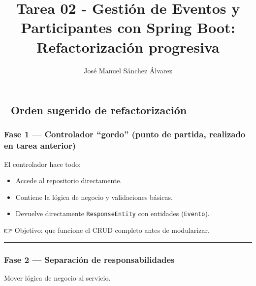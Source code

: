 \documentclass[
]{article}
\title{Tarea 02 - Gestión de Eventos y Participantes con Spring Boot:
Refactorización progresiva}
\author{José Manuel Sánchez Álvarez}
\date{}
\providecommand{\tightlist}{%
  \setlength{\itemsep}{0pt}\setlength{\parskip}{0pt}}
\begin{document}
\maketitle

{
\setcounter{tocdepth}{2}
\tableofcontents
}
\subsection{\texorpdfstring{🧩 \textbf{Orden sugerido de
refactorización}}{🧩 Orden sugerido de refactorización}}\label{orden-sugerido-de-refactorizaciuxf3n}

\subsubsection{\texorpdfstring{\textbf{Fase 1 --- Controlador ``gordo''
(punto de partida, realizado en tarea
anterior)}}{Fase 1 --- Controlador ``gordo'' (punto de partida, realizado en tarea anterior)}}\label{fase-1-controlador-gordo-punto-de-partida-realizado-en-tarea-anterior}

El controlador hace todo:

\begin{itemize}
\tightlist
\item
  Accede al repositorio directamente.
\item
  Contiene la lógica de negocio y validaciones básicas.
\item
  Devuelve directamente \texttt{ResponseEntity} con entidades
  (\texttt{Evento}).
\end{itemize}

👉 Objetivo: que funcione el CRUD completo antes de modularizar.

\begin{center}\rule{0.5\linewidth}{0.5pt}\end{center}

\subsubsection{\texorpdfstring{\textbf{Fase 2 --- Separación de
responsabilidades}}{Fase 2 --- Separación de responsabilidades}}\label{fase-2-separaciuxf3n-de-responsabilidades}

Mover lógica de negocio al servicio.
\end{document}
